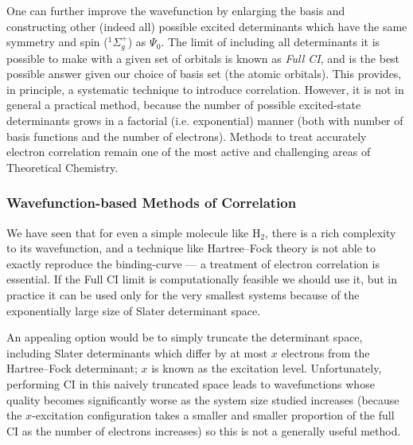 \documentclass{article}
\theoremstyle{plain}\theoremheaderfont{\normalfont\itshape}\theorembodyfont{\rmfamily}\theoremseparator{.}\newtheorem*{rem}{Remark}\newtheorem*{ex}{Example}\newtheorem*{proof}{Proof}\newtheorem*{altp}{Alternative proof}
\theoremstyle{plain}\theoremheaderfont{\normalfont\bfseries}\theorembodyfont{\rmfamily}\theoremseparator{.}\newtheorem{thm}{Theorem}[section]\newtheorem{lem}[thm]{Lemma}\newtheorem{prop}[thm]{Proposition}\newtheorem*{cor}{Corollary}\newtheorem{defn}[thm]{Definition}\newtheorem{clm}[thm]{Claim}\newtheorem{clminproof}{Claim}\newtheorem{pos}{Postulate}[section]
\theoremstyle{break}\theoremheaderfont{\normalfont\itshape}\theorembodyfont{\rmfamily}\theoremseparator{.\medskip}\newtheorem*{proofskip}{Proof}\newtheorem*{exs}{Examples}\newtheorem*{rems}{Remarks}
\theoremstyle{break}\theoremheaderfont{\normalfont\bfseries}\theorembodyfont{\rmfamily}\theoremseparator{.\medskip}\newtheorem{lemskip}[thm]{Lemma}\newtheorem{defnskip}[thm]{Definition}\newtheorem{propskip}[thm]{Proposition}\newtheorem{thmskip}[thm]{Theorem}
\numberwithin{equation}{section}
\begin{document}
    One can further improve the wavefunction by enlarging the basis and constructing other (indeed all) possible excited determinants which have the same symmetry and spin (\(^1\Sigma_g^+\)) as \(\Psi_0\). The limit of including all determinants it is possible to make with a given set of orbitals is known as \textit{Full CI}, and is the best possible answer given our choice of basis set (the atomic orbitals). This provides, in principle, a systematic technique to introduce correlation. However, it is not in general a practical method, because the number of possible excited-state determinants grows in a factorial (i.e. exponential) manner (both with number of basis functions and the number of electrons). Methods to treat accurately electron correlation remain one of the most active and challenging areas of Theoretical Chemistry.

    \subsubsection{Wavefunction-based Methods of Correlation}
    We have seen that for even a simple molecule like \(\mathrm{H_2}\), there is a rich complexity to its wavefunction, and a technique like Hartree--Fock theory is not able to exactly reproduce the binding-curve --- a treatment of electron correlation is essential. If the Full CI limit is computationally feasible we should use it, but in practice it can be used only for the very smallest systems because of the exponentially large size of Slater determinant space.
    
    An appealing option would be to simply truncate the determinant space, including Slater determinants which differ by at most \(x\) electrons from the Hartree--Fock determinant; \(x\) is known as the excitation level. Unfortunately, performing CI in this naively truncated space leads to wavefunctions whose quality becomes significantly worse as the system size studied increases (because the \(x\)-excitation configuration takes a smaller and smaller proportion of the full CI as the number of electrons increases) so this is not a generally useful method.
\end{document}
